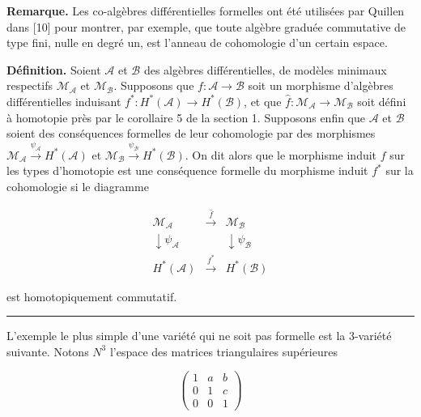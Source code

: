 \documentclass[
  french,
  a3paper,
  a3paper]{extarticle}
\begin{document}
\textbf{Remarque.} Les co-algèbres différentielles formelles ont été
utilisées par Quillen dans {[}10{]} pour montrer, par exemple, que toute
algèbre graduée commutative de type fini, nulle en degré un, est
l'anneau de cohomologie d'un certain espace.

\textbf{Définition.} Soient \(\mathcal A\) et \(\mathcal B\) des
algèbres différentielles, de modèles minimaux respectifs
\(\mathcal M_{\mathcal A}\) et \(\mathcal M_{\mathcal B}\). Supposons
que \(f:\mathcal A\longrightarrow\mathcal B\) soit un morphisme
d'algèbres différentielles induisant
\(f^*:H^*(\mathcal A)\longrightarrow H^*(\mathcal B)\), et que
\(\widehat f:\mathcal M_{\mathcal A}\longrightarrow\mathcal M_{\mathcal B}\)
soit défini à homotopie près par le corollaire 5 de la section 1.
Supposons enfin que \(\mathcal A\) et \(\mathcal B\) soient des
conséquences formelles de leur cohomologie par des morphismes
\(\mathcal M_{\mathcal A}\xrightarrow{\psi_{\mathcal A}}H^*(\mathcal A)\)
et
\(\mathcal M_{\mathcal B}\xrightarrow{\psi_{\mathcal B}}H^*(\mathcal B)\).
On dit alors que le morphisme induit \(f\) sur les types d'homotopie est
une conséquence formelle du morphisme induit \(f^*\) sur la cohomologie
si le diagramme

\[\begin{array}{ccc}\mathcal M_{\mathcal A}&\xrightarrow{\widehat f}&\mathcal M_{\mathcal B}\\\downarrow{\scriptstyle\psi_{\mathcal A}}&&\downarrow{\scriptstyle\psi_{\mathcal B}}\\H^*(\mathcal A)&\xrightarrow{f^*}&H^*(\mathcal B)\end{array}\]

est homotopiquement commutatif.

\clearpage



\par

\vspace{0.7mm}\hrule\vspace{1.6mm}

\fontsize{9}{11}\selectfont

L'exemple le plus simple d'une variété qui ne soit pas formelle est la
\(3\)-variété suivante. Notons \(N^3\) l'espace des matrices
triangulaires supérieures

\[\begin{pmatrix}1&a&b\\0&1&c\\0&0&1\end{pmatrix}\]
\end{document}
